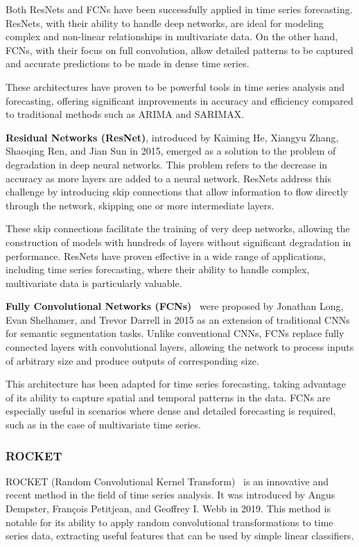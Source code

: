 Both ResNets and FCNs have been successfully applied in time series forecasting. ResNets, with their ability to handle deep networks, are ideal for modeling complex and non-linear relationships in multivariate data. On the other hand, FCNs, with their focus on full convolution, allow detailed patterns to be captured and accurate predictions to be made in dense time series.

These architectures have proven to be powerful tools in time series analysis and forecasting, offering significant improvements in accuracy and efficiency compared to traditional methods such as ARIMA and SARIMAX.
\vspace{10pt}

\textbf{Residual Networks (ResNet)}, introduced by Kaiming He, Xiangyu Zhang, Shaoqing Ren, and Jian Sun in 2015, emerged as a solution to the problem of degradation in deep neural networks. This problem refers to the decrease in accuracy as more layers are added to a neural network. ResNets address this challenge by introducing skip connections that allow information to flow directly through the network, skipping one or more intermediate layers.

These skip connections facilitate the training of very deep networks, allowing the construction of models with hundreds of layers without significant degradation in performance. ResNets have proven effective in a wide range of applications, including time series forecasting, where their ability to handle complex, multivariate data is particularly valuable.
\vspace{10pt}

\textbf{Fully Convolutional Networks (FCNs)}~\cite{long2015fullyconvolutionalnetworkssemantic} were proposed by Jonathan Long, Evan Shelhamer, and Trevor Darrell in 2015 as an extension of traditional CNNs for semantic segmentation tasks. Unlike conventional CNNs, FCNs replace fully connected layers with convolutional layers, allowing the network to process inputs of arbitrary size and produce outputs of corresponding size.

This architecture has been adapted for time series forecasting, taking advantage of its ability to capture spatial and temporal patterns in the data. FCNs are especially useful in scenarios where dense and detailed forecasting is required, such as in the case of multivariate time series.
\vspace{10pt}

\subsubsection{ROCKET}
ROCKET (Random Convolutional Kernel Transform)~\cite{Dempster_2020} is an innovative and recent method in the field of time series analysis. It was introduced by Angus Dempster, François Petitjean, and Geoffrey I. Webb in 2019. This method is notable for its ability to apply random convolutional transformations to time series data, extracting useful features that can be used by simple linear classifiers.

